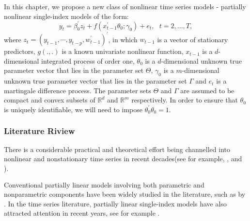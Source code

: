 \documentclass[a4paper,12pt,times,numbered,print,index]{report}
\numberwithin{equation}{section}
\begin{document}
In this chapter, we propose a new class of nonlinear time series models - partially nonlinear single-index models of the form:
\begin{equation}
	y_{t} = \beta_0^{\prime} z_t + f\left( x_{t-1}^{\prime }\theta_0; \gamma_0\right) +e_{t},\ \ \
	t=2,...,T,  \label{PL model}
\end{equation}%
where $z_t = (y_{t-1}, \cdots, y_{t-p}, w_{t-1}^{\prime})^{\prime}$, in which $w_{t-1}$ is a vector of stationary predictors, 
$g\left( .,.\right) $ is a known univariate nonlinear function, $x_{t-1}$ is a $d$-dimensional integrated process of order one, $\theta _{0}$ is a $d$-dimensional unknown true parameter vector that lies in the parameter set $\Theta $, $\gamma _{0}$ is a $m$-dimensional unknown true parameter vector that lies in the parameter set $\Gamma $ and $e_{t}$ is a martingale
difference process. The parameter sets $\Theta $ and $\Gamma $ are assumed to be compact and convex subsets of $\mathbb{R}^{d}$ and $\mathbb{R}^{m}$ respectively. In order to ensure that $\theta_0$ is uniquely identifiable, we will need to impose $\theta_{0}^{\prime}\theta_{0} = 1$. 



\subsubsection{Literature Riview}
There is a considerable practical and theoretical effort being channelled into nonlinear and nonstationary time series in recent decades(see for example, \cite{park2001nonlinear}, \cite{park2002nonstationary} and \cite{gao2009nonparametric}). 

Conventional partially linear models involving both parametric and nonparametric components have been widely studied in the literature, such as by \cite{gao2007nonlinear}. In the time series literature, partially linear single-index models have also attracted attention in recent years, see for example \cite{dong2016estimation}. 
\end{document}
